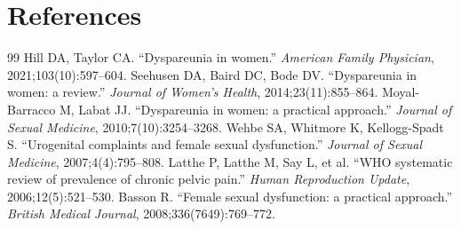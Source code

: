 \section*{References}
\begin{thebibliography}{99}
 Hill DA, Taylor CA. ``Dyspareunia in women.'' \textit{American Family Physician}, 2021;103(10):597--604.
 Seehusen DA, Baird DC, Bode DV. ``Dyspareunia in women: a review.'' \textit{Journal of Women's Health}, 2014;23(11):855--864.
 Moyal-Barracco M, Labat JJ. ``Dyspareunia in women: a practical approach.'' \textit{Journal of Sexual Medicine}, 2010;7(10):3254--3268.
 Wehbe SA, Whitmore K, Kellogg-Spadt S. ``Urogenital complaints and female sexual dysfunction.'' \textit{Journal of Sexual Medicine}, 2007;4(4):795--808.
 Latthe P, Latthe M, Say L, et al. ``WHO systematic review of prevalence of chronic pelvic pain.'' \textit{Human Reproduction Update}, 2006;12(5):521--530.
 Basson R. ``Female sexual dysfunction: a practical approach.'' \textit{British Medical Journal}, 2008;336(7649):769--772.

\end{thebibliography}
